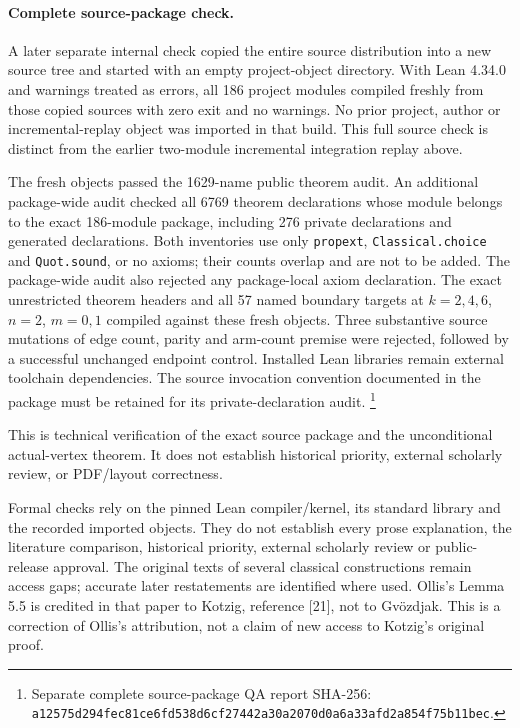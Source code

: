 \documentclass[11pt,a4paper]{article}
\theoremstyle{definition}\newtheorem{definition}[theorem]{Definition}
\theoremstyle{remark}\newtheorem{remark}[theorem]{Remark}
\begin{document}
\paragraph{Complete source-package check.}
A later separate internal check copied the entire source distribution
into a new source tree and started with an empty project-object
directory. With Lean 4.34.0 and warnings treated as errors, all 186
project modules compiled freshly from those copied sources with zero
exit and no warnings. No prior project, author or incremental-replay
object was imported in that build. This full source check is distinct
from the earlier two-module incremental integration replay above.

The fresh objects passed the 1629-name public theorem audit. An
additional package-wide audit checked all 6769 theorem declarations
whose module belongs to the exact 186-module package, including 276
private declarations and generated declarations. Both inventories use
only \texttt{propext}, \texttt{Classical.choice} and \texttt{Quot.sound},
or no axioms; their counts overlap and are not to be added. The
package-wide audit also rejected any package-local axiom declaration.
The exact unrestricted theorem headers and all 57 named boundary
targets at $k=2,4,6$, $n=2$, $m=0,1$ compiled against these fresh
objects. Three substantive source mutations of edge count, parity and
arm-count premise were rejected, followed by a successful unchanged
endpoint control. Installed Lean libraries remain external toolchain
dependencies. The source invocation convention documented in the
package must be retained for its private-declaration audit.
\footnote{Separate complete source-package QA report SHA-256:
\texttt{a12575d294fec81ce6fd538d6cf27442a30a2070d0a6a33afd2a854f75b11bec}.}

This is technical verification of the exact source package and the
unconditional actual-vertex theorem. It does not establish historical
priority, external scholarly review, or PDF/layout correctness.

Formal checks rely on the pinned Lean compiler/kernel, its standard
library and the recorded imported objects. They do not establish every
prose explanation, the literature comparison, historical priority,
external scholarly review or public-release approval.
The original texts of several classical constructions remain access
gaps; accurate later restatements are identified where used. Ollis's
Lemma 5.5 is credited in that paper to Kotzig, reference [21], not to
Gv\"ozdjak. This is a correction of Ollis's attribution, not a claim
of new access to Kotzig's original proof.
\end{document}
